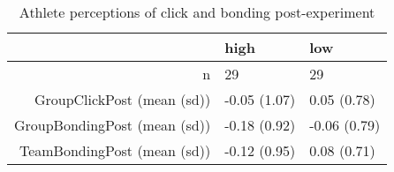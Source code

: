 \begin{table}[ht]
\centering
\begin{tabular}{rll}
  \hline
 & high & low \\ 
  \hline
n &    29 &    29 \\ 
  GroupClickPost (mean (sd)) & -0.05 (1.07) &  0.05 (0.78) \\ 
  GroupBondingPost (mean (sd)) & -0.18 (0.92) & -0.06 (0.79) \\ 
  TeamBondingPost (mean (sd)) & -0.12 (0.95) &  0.08 (0.71) \\ 
   \hline
\end{tabular}
\caption{Athlete perceptions of click and bonding 
 post-experiment} 
\label{tab:clickBondConditionPost}
\end{table}
